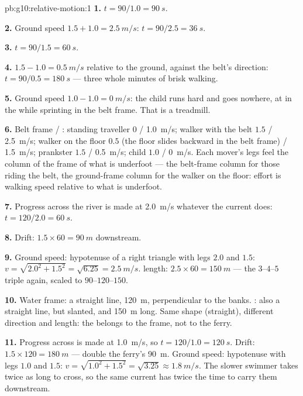 \begin{solution}{pb:g10:relative-motion:1}
\textbf{1.} $t = 90/1.0 = \qty{90}{s}$.

\textbf{2.} Ground speed $1.5 + 1.0 = \qty{2.5}{m/s}$:
$t = 90/2.5 = \qty{36}{s}$.

\textbf{3.} $t = 90/1.5 = \qty{60}{s}$.

\textbf{4.} $1.5 - 1.0 = \qty{0.5}{m/s}$ relative to the ground,
against the belt's direction: $t = 90/0.5 = \qty{180}{s}$ --- three
whole minutes of brisk walking.

\textbf{5.} Ground speed $1.0 - 1.0 = \qty{0}{m/s}$: the child runs
hard and goes nowhere, at  in the  while sprinting in
the belt frame. That is a treadmill.

\textbf{6.} Belt frame / : standing traveller $0$ /
\qty{1.0}{m/s}; walker with the belt $1.5$ / \qty{2.5}{m/s}; walker on
the floor $0.5$ (the floor slides backward in the belt frame) /
\qty{1.5}{m/s}; prankster $1.5$ / \qty{0.5}{m/s}; child $1.0$ /
\qty{0}{m/s}. Each mover's legs feel the column of the frame of what
is underfoot --- the belt-frame column for those riding the belt, the
ground-frame column for the walker on the floor: effort is walking
speed relative to what is underfoot.

\textbf{7.} Progress across the river is made at \qty{2.0}{m/s}
whatever the current does: $t = 120/2.0 = \qty{60}{s}$.

\textbf{8.} Drift: $1.5 \times 60 = \qty{90}{m}$ downstream.

\textbf{9.} Ground speed: hypotenuse of a right triangle with legs
$2.0$ and $1.5$: $v = \sqrt{2.0^2 + 1.5^2} = \sqrt{6.25}
= \qty{2.5}{m/s}$.  length: $2.5 \times 60 = \qty{150}{m}$
--- the $3$--$4$--$5$ triple again, scaled to $90$--$120$--$150$.

\textbf{10.} Water frame: a straight line, \qty{120}{m}, perpendicular
to the banks. : also a straight line, but slanted, and
\qty{150}{m} long. Same shape (straight), different direction and
length: the  belongs to the frame, not to the ferry.

\textbf{11.} Progress across is made at \qty{1.0}{m/s}, so
$t = 120/1.0 = \qty{120}{s}$. Drift: $1.5 \times 120 = \qty{180}{m}$
--- double the ferry's \qty{90}{m}. Ground speed: hypotenuse with legs
$1.0$ and $1.5$: $v = \sqrt{1.0^2 + 1.5^2} = \sqrt{3.25}
\approx \qty{1.8}{m/s}$. The slower swimmer takes twice as long to
cross, so the same current has twice the time to carry them
downstream.


\end{solution}
